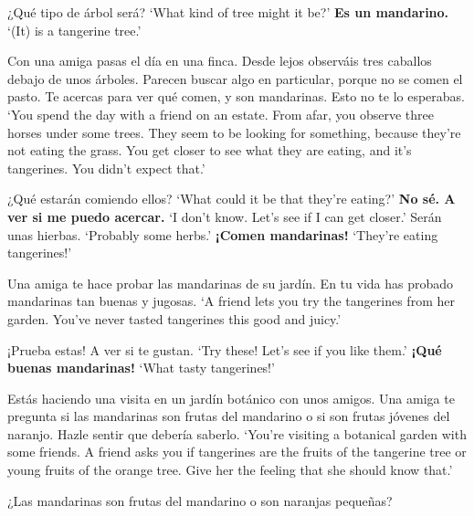 \begin{exe}
	\begin{xlist}[A:]
	 ¿Qué tipo de árbol será? \href{https://osf.io/yvxm8/}{\faVolumeUp}
	\glt `What kind of tree might it be?' 
	 \textbf{Es un mandarino.} 
	\glt `(It) is a tangerine tree.' 
	\end{xlist}
\ex \label{ex:experimentoMIRDECLmandarin_APP}
	Con una amiga pasas el día en una finca. Desde lejos observáis tres caballos debajo de unos árboles. Parecen buscar algo en particular, porque no se comen el pasto. Te acercas para ver qué comen, y son mandarinas. Esto no te lo esperabas. 
	\glt `You spend the day with a friend on an estate. From afar, you observe three horses under some trees. They seem to be looking for something, because they're not eating the grass. You get closer to see what they are eating, and it's tangerines. You didn't expect that.' 
	\begin{xlist}[A:]
	 ¿Qué estarán comiendo ellos? \href{https://osf.io/6n8ep/}{\faVolumeUp}
	\glt `What could it be that they're eating?' 
	 \textbf{No sé. A ver si me puedo acercar.} 
	\glt `I don't know. Let's see if I can get closer.' 
	 Serán unas hierbas. \href{https://osf.io/quhsx/}{\faVolumeUp}
	\glt `Probably some herbs.' 
	 \textbf{¡Comen mandarinas!} 
	\glt `They're eating tangerines!' 
	\end{xlist}
\ex \label{ex:experimentoEXCLmandarin_APP}
	Una amiga te hace probar las mandarinas de su jardín. En tu vida has probado mandarinas tan buenas y jugosas. 
	\glt `A friend lets you try the tangerines from her garden. You've never tasted tangerines this good and juicy.' 
	\begin{xlist}[A:]
	 ¡Prueba estas! A ver si te gustan. \href{https://osf.io/awczv/}{\faVolumeUp}
	\glt `Try these! Let's see if you like them.' 
	 \textbf{¡Qué buenas mandarinas!}  
	\glt `What tasty tangerines!' 
	\end{xlist}
\ex \label{ex:experimentoOBVASSmandarin_APP}
	Estás haciendo una visita en un jardín botánico con unos amigos. Una amiga te pregunta si las mandarinas son frutas del mandarino o si son frutas jóvenes del naranjo. Hazle sentir que debería saberlo. 
	\glt `You're visiting a botanical garden with some friends. A friend asks you if tangerines are the fruits of the tangerine tree or young fruits of the orange tree. Give her the feeling that she should know that.' 
	\begin{xlist}[A:]
	 ¿Las mandarinas son frutas del mandarino o son naranjas pequeñas? \href{https://osf.io/v63xk/}{\faVolumeUp}

\end{xlist}
\end{exe}
